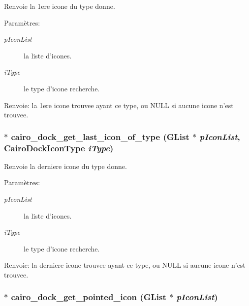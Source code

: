 Renvoie la 1ere icone du type donne. \begin{Desc}
\item[Paramètres:]
\begin{description}
\item[{\em pIconList}]la liste d'icones. \item[{\em iType}]le type d'icone recherche. \end{description}
\end{Desc}
\begin{Desc}
\item[Renvoie:]la 1ere icone trouvee ayant ce type, ou NULL si aucune icone n'est trouvee. \end{Desc}
\subsubsection{$\ast$ cairo\_\-dock\_\-get\_\-last\_\-icon\_\-of\_\-type (GList $\ast$ {\em pIconList}, {\bf CairoDockIconType} {\em iType})}\label{cairo-dock-icons_8h_93932d590d2ac32c52a2726f5c497334}


Renvoie la derniere icone du type donne. \begin{Desc}
\item[Paramètres:]
\begin{description}
\item[{\em pIconList}]la liste d'icones. \item[{\em iType}]le type d'icone recherche. \end{description}
\end{Desc}
\begin{Desc}
\item[Renvoie:]la derniere icone trouvee ayant ce type, ou NULL si aucune icone n'est trouvee. \end{Desc}
\subsubsection{$\ast$ cairo\_\-dock\_\-get\_\-pointed\_\-icon (GList $\ast$ {\em pIconList})}\label{cairo-dock-icons_8h_4e8cf7b6a3e5f061e6e18010ba9da590}


